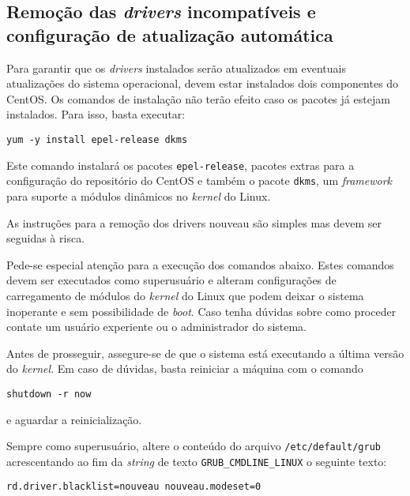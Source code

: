 \documentclass[twoside,a4paper,12pt,english]{inac17}
\begin{document}
\subsection{Remoção das \textit{drivers} incompatíveis e configuração de 
atualização automática}

Para garantir que os \textit{drivers} instalados serão atualizados em eventuais 
atualizações do sistema operacional, devem estar instalados dois componentes do 
CentOS. Os comandos de instalação não terão efeito caso os pacotes já estejam 
instalados. Para isso, basta executar:

\texttt{yum -y install epel-release dkms}

Este comando instalará os pacotes \texttt{epel-release}, pacotes extras para 
a configuração do repositório do CentOS e também o pacote \texttt{dkms}, um 
\textit{framework} para suporte a módulos dinâmicos no \textit{kernel} do Linux.

As instruções para a remoção dos drivers nouveau são simples mas devem ser seguidas 
à risca.

\begin{shadedbox}
Pede-se especial atenção para a execução dos comandos abaixo. Estes comandos devem 
ser executados como superusuário e alteram configurações de carregamento de módulos 
do \textit{kernel} do Linux que podem deixar o sistema inoperante e sem possibilidade 
de \textit{boot}. Caso tenha dúvidas sobre como proceder contate um usuário 
experiente ou o administrador do sistema.
\end{shadedbox}

Antes de prosseguir, assegure-se de que o sistema está executando a última versão 
do \textit{kernel}. Em caso de dúvidas, basta reiniciar a máquina com o comando 

\texttt{shutdown -r now}

e aguardar a reinicialização.

Sempre como superusuário, altere o conteúdo do arquivo \texttt{/etc/default/grub} 
acrescentando ao fim da \textit{string} de texto \texttt{GRUB\_CMDLINE\_LINUX} 
o seguinte texto:

\texttt{rd.driver.blacklist=nouveau nouveau.modeset=0}

\end{document}
